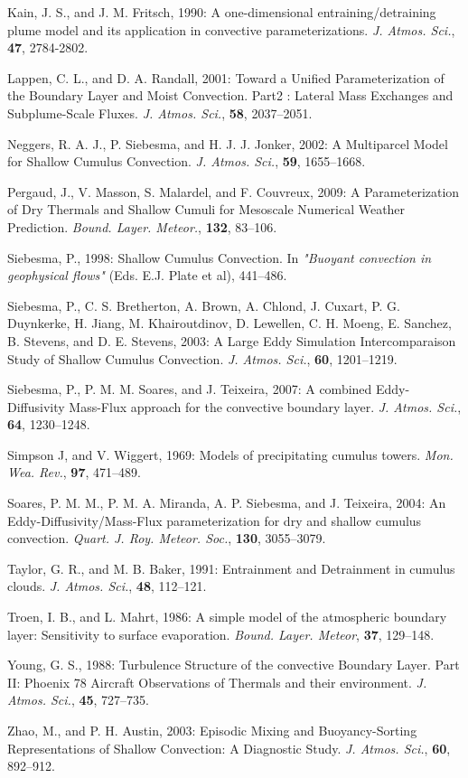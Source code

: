 \noindent \por
Kain, J. S., and J. M. Fritsch, 1990: A one-dimensional
entraining/detraining plume model and its application in
convective parameterizations. {\it J. Atmos. Sci.},
{\bf 47}, 2784-2802.

\noindent \por
Lappen, C. L., and D. A. Randall, 2001:
Toward a Unified Parameterization of the Boundary Layer and Moist Convection. 
Part2 : Lateral Mass Exchanges and Subplume-Scale Fluxes.
{\it J. Atmos. Sci.}, {\bf 58}, 2037--2051.

\noindent \por
Neggers, R. A. J., P. Siebesma, and H. J. J. Jonker, 2002:
 A Multiparcel Model for Shallow Cumulus Convection.
{\it J. Atmos. Sci.}, {\bf 59}, 1655--1668.

\noindent \por
Pergaud, J., V. Masson, S. Malardel, and F. Couvreux, 2009:
A Parameterization of Dry
  Thermals and Shallow Cumuli for Mesoscale Numerical Weather Prediction.
{\it Bound. Layer. Meteor.}, {\bf 132}, 83--106.

\noindent \por
Siebesma, P., 1998: Shallow Cumulus Convection.
In {\it "Buoyant convection in geophysical flows"} (Eds. E.J. Plate et al),
441--486.

\noindent \por
Siebesma, P., C. S. Bretherton, A. Brown, A. Chlond, J. Cuxart, 
P. G. Duynkerke, H. Jiang, M. Khairoutdinov, D. Lewellen, C. H. Moeng,
E. Sanchez, B. Stevens, and D. E. Stevens, 2003:
A Large Eddy Simulation Intercomparaison Study of Shallow Cumulus Convection.
{\it J. Atmos. Sci.}, {\bf 60}, 1201--1219.

\noindent \por
Siebesma, P., P. M. M. Soares, and J. Teixeira, 2007:
A combined Eddy-Diffusivity Mass-Flux 
approach for the convective boundary layer.
{\it J. Atmos. Sci.}, {\bf 64}, 1230--1248.

\noindent \por
Simpson J, and V. Wiggert, 1969: Models of precipitating cumulus towers.
{\it Mon. Wea. Rev.}, {\bf 97}, 471--489.

\noindent \por
Soares, P. M. M., P. M. A. Miranda, A. P. Siebesma, and J. Teixeira, 2004:
An Eddy-Diffusivity/Mass-Flux parameterization for dry and shallow cumulus
  convection.
{\it Quart. J. Roy. Meteor. Soc.}, {\bf 130}, 3055--3079.

\noindent \por
Taylor, G. R., and M. B. Baker, 1991: 
Entrainment and Detrainment in cumulus clouds.
{\it J. Atmos. Sci.}, {\bf 48}, 112--121.

\noindent \por
Troen, I. B., and L. Mahrt, 1986:
A simple model of the atmospheric boundary layer: 
Sensitivity to surface evaporation.
{\it Bound. Layer. Meteor}, {\bf 37}, 129--148.

\noindent \por
Young, G. S., 1988: Turbulence Structure of the convective Boundary Layer. Part II:
  Phoenix 78 Aircraft Observations of Thermals and their environment.
{\it J. Atmos. Sci.}, {\bf 45}, 727--735.

\noindent \por
Zhao, M., and P. H. Austin, 2003:
Episodic Mixing and Buoyancy-Sorting Representations
  of Shallow Convection: A Diagnostic Study.
{\it J. Atmos. Sci.}, {\bf 60}, 892--912.
